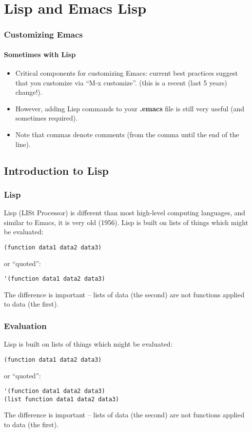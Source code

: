 \documentclass{beamer}
\begin{document}
\section{Lisp and Emacs Lisp}

\begin{frame}
  \frametitle{Customizing Emacs}
  \framesubtitle{Sometimes with Lisp}
  \begin{itemize}
  \item Critical components for customizing Emacs: current best
    practices suggest that you customize via ``M-x customize''. (this
    is a recent (last 5 years) change!).
  \item However, adding Lisp commands to your \textbf{.emacs} file is 
    still very useful (and sometimes required).
  \item Note that commas denote comments (from the comma until the end
    of the line).
  \end{itemize}
\end{frame}

\subsection{Introduction to Lisp}

\begin{frame}[fragile]
  \frametitle{Lisp}
  Lisp (LISt Processor) is different than most high-level computing
  languages, and similar to Emacs, it is very old (1956).  Lisp is
  built on lists of things which might be evaluated:
\begin{verbatim}
(function data1 data2 data3)
\end{verbatim}
  or ``quoted'':
\begin{verbatim}
'(function data1 data2 data3)
\end{verbatim}
  The difference is important -- lists of data (the second) are not
  functions applied to data (the first).
\end{frame}

\begin{frame}[fragile]
  \frametitle{Evaluation}
  Lisp is built on lists of things which might be evaluated:
\begin{verbatim}
(function data1 data2 data3)
\end{verbatim}
  or ``quoted'':
\begin{verbatim}
'(function data1 data2 data3)
(list function data1 data2 data3)
\end{verbatim}
  The difference is important -- lists of data (the second) are not
  functions applied to data (the first).
\end{frame}
\end{document}
